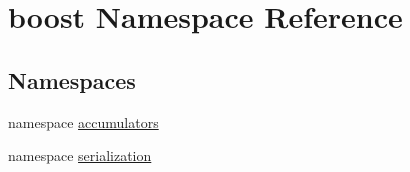 \hypertarget{namespaceboost}{\section{boost Namespace Reference}
\label{namespaceboost}
}
\subsection*{Namespaces}
\begin{DoxyCompactItemize}
\item 
namespace \hyperlink{namespaceboost_1_1accumulators}{accumulators}
\item 
namespace \hyperlink{namespaceboost_1_1serialization}{serialization}
\end{DoxyCompactItemize}
